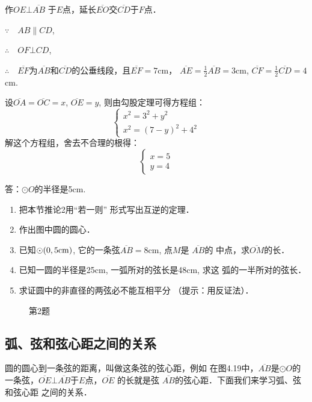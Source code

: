 \begin{solution}
    作$OE\bot \overline{AB}$
于$E$点，延长$\overline{EO}$交$\overline{CD}$于$F$点．

$\because\quad AB\parallel CD$,

$\therefore\quad OF\bot CD$,

$\therefore\quad \overline{EF}$为$\overline{AB}$和$\overline{CD}$的公垂线段，且$\overline{EF}=7$cm，
$\overline{AE}=\frac{1}{2}\overline{AB}=3$cm, $\overline{CF}=
\frac{1}{2}\overline{CD}=4$cm.

设$\overline{OA}=\overline{OC}=x$, $\overline{OE}=y$, 则由勾股定理可得方程组：
\[\begin{cases}
    x^2=3^2+y^2\\
    x^2=(7-y)^2+4^2
\end{cases}\]
解这个方程组，舍去不合理的根得：
\[\begin{cases}
    x=5\\y=4
\end{cases}\]

答：$\odot O$的半径是5cm.
\end{solution}

\begin{ex}
\begin{enumerate}
    \item 把本节推论2用“若一则”
    形式写出互逆的定理．
    \item 作出图中圆的圆心．
    \item 已知$\odot(0,5{\rm cm})$, 它的一条弦$\overline{AB}=8$cm, 点$M$是
    $\overline{AB}$的
    中点，求$\overline{OM}$的长．
    \item 已知一圆的半径是25cm, 一弧所对的弦长是48cm, 求这
    弧的一半所对的弦长．
    \item 求证圆中的非直径的两弦必不能互相平分
    （提示：用反证法）．
\end{enumerate}
\end{ex}

\begin{figure}[htp]
    \centering
{}
    \caption*{第2题}
\end{figure}

\subsection{弧、弦和弦心距之间的关系}
圆的圆心到一条弦的距离，叫做这条弦的弦心距，例如
在图4.19中，$\overline{AB}$是$\odot O$的一条弦，$\overline{OE}\bot \overline{AB}$于$E$点，$\overline{OE}$
的长就是弦
$\overline{AB}$的弦心距．下面我们来学习弧、弦和弦心距
之间的关系．

